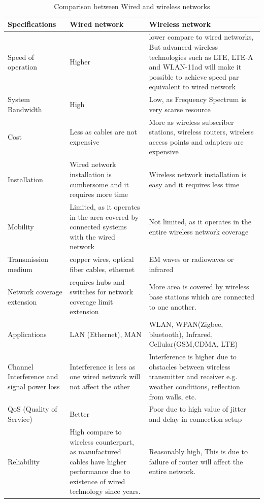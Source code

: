 \begin{table}
\caption{Comparison between Wired and wireless networks}
\begin{center}
\begin{tabular}{p{}p{}p{}}
\hline
Specifications       & Wired network    & Wireless network       \\ \hline
Speed of operation   & Higher           & lower compare to wired networks, But advanced wireless technologies such as LTE, LTE-A and WLAN-11ad will make it possible to achieve speed par equivalent to wired network \\
System Bandwidth     & High              & Low, as Frequency Spectrum is very scarse resource    \\
Cost                 & Less as cables are not expensive      & More as wireless subscriber stations, wireless routers, wireless access points and adapters are expensive                 \\
Installation         & Wired network installation is cumbersome and it requires more time   & Wireless network installation is easy and it requires less time             \\
Mobility            & Limited, as it operates in the area covered by connected systems with the wired network                & Not limited, as it operates in the entire wireless network coverage         \\
Transmission medium     & copper wires, optical fiber cables, ethernet   & EM waves or radiowaves or infrared  \\
Network coverage extension    & requires hubs and switches for network coverage limit extension  & More area is covered by wireless base stations which are connected to one another.    \\
Applications           & LAN (Ethernet), MAN        & WLAN, WPAN(Zigbee, bluetooth), Infrared, Cellular(GSM,CDMA, LTE) \\
Channel Interference and signal power loss & Interference is less as one wired network will not affect the other                          & Interference is higher due to obstacles between wireless transmitter and receiver e.g. weather conditions, reflection from walls, etc.                                      \\
QoS (Quality of Service)                   & Better           & Poor due to high value of jitter and delay in connection setup  \\
Reliability           & High compare to wireless counterpart, as manufactured cables have higher performance due to existence of wired technology since years. & Reasonably high, This is due to failure of router will affect the entire network.    \\ \hline
\end{tabular}
\end{center}
\label{tab12}
\end{table}